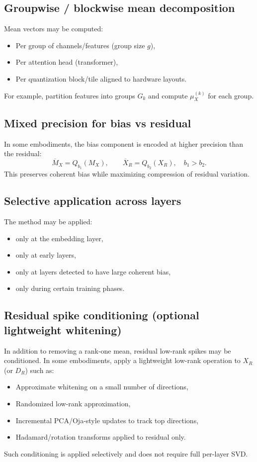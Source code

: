 \documentclass[11pt]{article}
\begin{document}
\subsection{Groupwise / blockwise mean decomposition}
Mean vectors may be computed:
\begin{itemize}[leftmargin=1.2em]
\item Per group of channels/features (group size $g$),
\item Per attention head (transformer),
\item Per quantization block/tile aligned to hardware layouts.
\end{itemize}
For example, partition features into groups $G_k$ and compute $\mu_X^{(k)}$ for each group.

\subsection{Mixed precision for bias vs residual}
In some embodiments, the bias component is encoded at higher precision than the residual:
\[
\overline{M}_X = Q_{b_1}(M_X),\qquad \overline{X}_R = Q_{b_2}(X_R),\quad b_1>b_2.
\]
This preserves coherent bias while maximizing compression of residual variation.

\subsection{Selective application across layers}
The method may be applied:
\begin{itemize}[leftmargin=1.2em]
\item only at the embedding layer,
\item only at early layers,
\item only at layers detected to have large coherent bias,
\item only during certain training phases.
\end{itemize}

\subsection{Residual spike conditioning (optional lightweight whitening)}
In addition to removing a rank-one mean, residual low-rank spikes may be conditioned. In some embodiments, apply a lightweight low-rank operation to $X_R$ (or $D_R$) such as:
\begin{itemize}[leftmargin=1.2em]
\item Approximate whitening on a small number of directions,
\item Randomized low-rank approximation,
\item Incremental PCA/Oja-style updates to track top directions,
\item Hadamard/rotation transforms applied to residual only.
\end{itemize}
Such conditioning is applied selectively and does not require full per-layer SVD.
\end{document}
